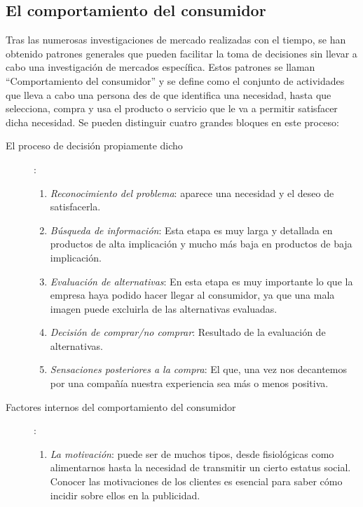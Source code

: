 \documentclass[10pt,a4paper,spanish]{report}
\begin{document}
		\subsection{\textcolor[rgb]{0.1,0.2,0.4}El comportamiento del consumidor}

			Tras las numerosas investigaciones de mercado realizadas con el tiempo, se han obtenido patrones generales que pueden facilitar la toma de decisiones sin llevar a cabo una investigación de mercados específica. Estos patrones se llaman ``Comportamiento del consumidor'' y se define como el conjunto de actividades que lleva a cabo una persona des de que identifica una necesidad, hasta que selecciona, compra y usa el producto o servicio que le va a permitir satisfacer dicha necesidad. Se pueden distinguir cuatro grandes bloques en este proceso:
			\begin{description}
				\item[El proceso de decisión propiamente dicho]:
				\begin{enumerate}
					\item \textit{\textcolor[rgb]{0.1,0.2,0.4}{Reconocimiento del problema}}: aparece una necesidad y el deseo de satisfacerla.
					\item \textit{\textcolor[rgb]{0.1,0.2,0.4}{Búsqueda de información}}: Esta etapa es muy larga y detallada en productos de alta implicación y mucho más baja en productos de baja implicación.
					\item \textit{\textcolor[rgb]{0.1,0.2,0.4}{Evaluación de alternativas}}: En esta etapa es muy importante lo que la empresa haya podido hacer llegar al consumidor, ya que una mala imagen puede excluirla de las alternativas evaluadas.
					\item \textit{\textcolor[rgb]{0.1,0.2,0.4}{Decisión de comprar/no comprar}}: Resultado de la evaluación de alternativas.
					\item \textit{\textcolor[rgb]{0.1,0.2,0.4}{Sensaciones posteriores a la compra}}: El que, una vez nos decantemos por una compañía nuestra experiencia sea más o menos positiva.
				\end{enumerate}
				\item[Factores internos del comportamiento del consumidor]:
				\begin{enumerate}
					\item \textit{\textcolor[rgb]{0.1,0.2,0.4}{La motivación}}: puede ser de muchos tipos, desde fisiológicas como alimentarnos hasta la necesidad de transmitir un cierto estatus social. Conocer las motivaciones de los clientes es esencial para saber cómo incidir sobre ellos en la publicidad.

\end{enumerate}
\end{description}
\end{document}
